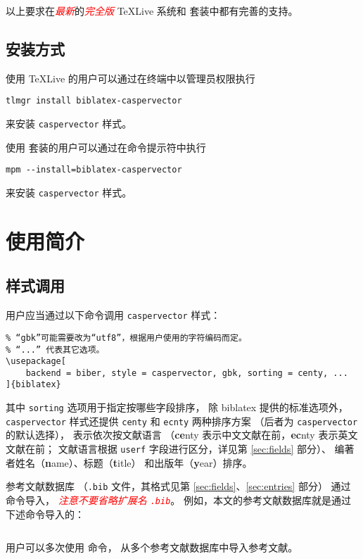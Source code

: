 \documentclass[UTF8, fancyhdr, hyperref]{ctexart}
\newcommand{\myemph}[1]{\emph{\textcolor{red}{#1}}}
\begin{document}
以上要求在\myemph{最新}的\myemph{完全版}
\TeX{}Live 系统和 \CTeX{} 套装中都有完善的支持。

\subsection{安装方式}

使用 \TeX{}Live 的用户可以通过在终端中以管理员权限执行
\begin{Verbatim}[frame = single]
tlmgr install biblatex-caspervector
\end{Verbatim}
来安装 \verb|caspervector| 样式。

使用 \CTeX{} 套装的用户可以通过在命令提示符中执行
\begin{Verbatim}[frame = single]
mpm --install=biblatex-caspervector
\end{Verbatim}
来安装 \verb|caspervector| 样式。

\section{使用简介}
\subsection{样式调用}

用户应当通过以下命令调用 \verb|caspervector| 样式：
\begin{Verbatim}[frame = single]
% 如果系统上无法使用 biber，可将“biber”改为“bibtex”。
% “gbk”可能需要改为“utf8”，根据用户使用的字符编码而定。
% “...” 代表其它选项。
\usepackage[
	backend = biber, style = caspervector, gbk, sorting = centy, ...
]{biblatex}
\end{Verbatim}
其中 \verb|sorting| 选项用于指定按哪些字段排序，
除 biblatex 提供的标准选项\supercite{biblatex}外，
\verb|caspervector| 样式还提供 \verb|centy| 和 \verb|ecnty| 两种排序方案
（后者为 \verb|caspervector| 的默认选择），
表示依次按文献语言
（\textbf{ce}nty 表示中文文献在前，\textbf{ec}nty 表示英文文献在前；
文献语言根据 \verb|userf| 字段进行区分，详见第 \ref{sec:fields} 部分）、
编著者姓名（\textbf{n}ame）、标题（\textbf{t}itle）
和出版年（\textbf{y}ear）排序。

参考文献数据库
（\verb|.bib| 文件，其格式见第 \ref{sec:fields}、\ref{sec:entries} 部分）
通过 \verb|| 命令导入，%
\myemph{注意不要省略扩展名 \texttt{.bib}}。
例如，本文的参考文献数据库就是通过下述命令导入的：
\begin{Verbatim}[frame = single]

\end{Verbatim}
用户可以多次使用 \verb|| 命令，
从多个参考文献数据库中导入参考文献。
\end{document}
